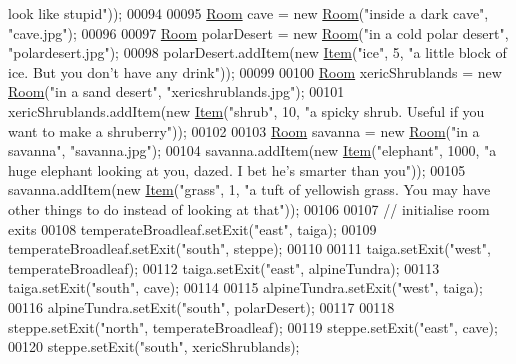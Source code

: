 \begin{DoxyCode}
{       look like stupid"}));
00094 
00095         \hyperlink{classRoom}{Room} cave = \textcolor{keyword}{new} \hyperlink{classRoom}{Room}(\textcolor{stringliteral}{"inside a dark cave"}, \textcolor{stringliteral}{"cave.jpg"});
00096 
00097         \hyperlink{classRoom}{Room} polarDesert = \textcolor{keyword}{new} \hyperlink{classRoom}{Room}(\textcolor{stringliteral}{"in a cold polar desert"}, \textcolor{stringliteral}{"polardesert.jpg"});
00098         polarDesert.addItem(\textcolor{keyword}{new} \hyperlink{classItem}{Item}(\textcolor{stringliteral}{"ice"}, 5, \textcolor{stringliteral}{"a little block of ice. But you don't have any drink"}));
00099 
00100         \hyperlink{classRoom}{Room} xericShrublands = \textcolor{keyword}{new} \hyperlink{classRoom}{Room}(\textcolor{stringliteral}{"in a sand desert"}, \textcolor{stringliteral}{"xericshrublands.jpg"});
00101         xericShrublands.addItem(\textcolor{keyword}{new} \hyperlink{classItem}{Item}(\textcolor{stringliteral}{"shrub"}, 10, \textcolor{stringliteral}{"a spicky shrub. Useful if you want to make a
       shruberry"}));
00102 
00103         \hyperlink{classRoom}{Room} savanna = \textcolor{keyword}{new} \hyperlink{classRoom}{Room}(\textcolor{stringliteral}{"in a savanna"}, \textcolor{stringliteral}{"savanna.jpg"});
00104         savanna.addItem(\textcolor{keyword}{new} \hyperlink{classItem}{Item}(\textcolor{stringliteral}{"elephant"}, 1000, \textcolor{stringliteral}{"a huge elephant looking at you, dazed. I bet he's
       smarter than you"}));
00105         savanna.addItem(\textcolor{keyword}{new} \hyperlink{classItem}{Item}(\textcolor{stringliteral}{"grass"}, 1, \textcolor{stringliteral}{"a tuft of yellowish grass. You may have other things to
       do instead of looking at that"}));
00106 
00107         \textcolor{comment}{// initialise room exits}
00108         temperateBroadleaf.setExit(\textcolor{stringliteral}{"east"}, taiga);
00109         temperateBroadleaf.setExit(\textcolor{stringliteral}{"south"}, steppe);
00110 
00111         taiga.setExit(\textcolor{stringliteral}{"west"}, temperateBroadleaf);
00112         taiga.setExit(\textcolor{stringliteral}{"east"}, alpineTundra);
00113         taiga.setExit(\textcolor{stringliteral}{"south"}, cave);
00114 
00115         alpineTundra.setExit(\textcolor{stringliteral}{"west"}, taiga);
00116         alpineTundra.setExit(\textcolor{stringliteral}{"south"}, polarDesert);
00117 
00118         steppe.setExit(\textcolor{stringliteral}{"north"}, temperateBroadleaf);
00119         steppe.setExit(\textcolor{stringliteral}{"east"}, cave);
00120         steppe.setExit(\textcolor{stringliteral}{"south"}, xericShrublands);

\end{DoxyCode}
